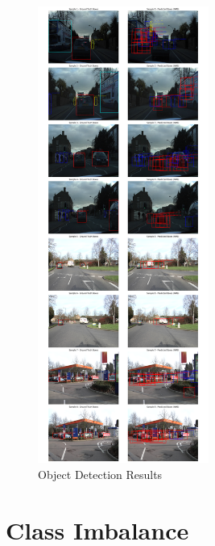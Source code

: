 \documentclass[conference]{IEEEtran}
\begin{document}
\begin{figure}[htbp]
    \centerline{\includegraphics[width=0.5\textwidth]{matrials/detection_results.png}}
    \caption{Object Detection Results}
    \label{fig:detection}
\end{figure}



\section{Class Imbalance}

\end{document}
